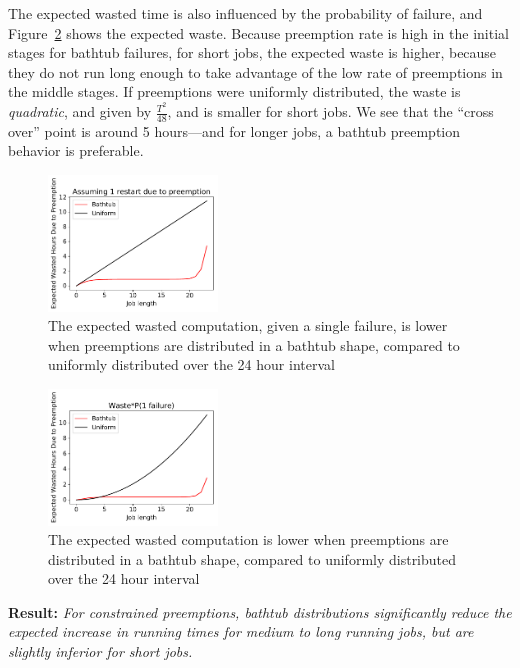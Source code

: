 The expected wasted time is also influenced by the probability of failure, and Figure~\ref{fig:vs-uniform-2} shows the expected waste.
Because preemption rate is high in the initial stages for bathtub failures, for short jobs, the expected waste is higher, because they do not run long enough to take advantage of the low rate of preemptions in the middle stages.
If preemptions were uniformly distributed, the waste is \emph{quadratic}, and given by $\frac{T^2}{48}$, and is smaller for short jobs. 
We see that the ``cross over'' point is around 5 hours---and for longer jobs, a bathtub preemption behavior is preferable.



\begin{figure}
  \includegraphics[width=0.4\textwidth]{../graphs/uniform-v-bathtub.pdf}
  \caption{The expected wasted computation, given a single failure, is lower when preemptions are distributed in a bathtub shape, compared to uniformly distributed over the 24 hour interval}
  \label{fig:vs-uniform}
\end{figure}

\begin{figure}
  \includegraphics[width=0.4\textwidth]{../graphs/uniform-v-bathtub-2.pdf}
  \caption{The expected wasted computation is lower when preemptions are distributed in a bathtub shape, compared to uniformly distributed over the 24 hour interval}
  \label{fig:vs-uniform-2}
\end{figure}

\noindent \textbf{Result:} \emph{For constrained preemptions, bathtub distributions significantly reduce the expected increase in running times for medium to long running jobs, but are slightly inferior for short jobs.}


